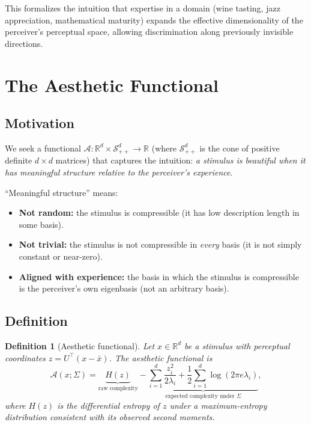 \documentclass[journal]{IEEEtran}
\newtheorem{definition}[theorem]{Definition}
\newcommand{\R}{\mathbb{R}}
\begin{document}
This formalizes the intuition that expertise in a domain (wine tasting,
jazz appreciation, mathematical maturity) expands the effective
dimensionality of the perceiver's perceptual space, allowing
discrimination along previously invisible directions.


\section{The Aesthetic Functional}
\label{sec:functional}

\subsection{Motivation}

We seek a functional $\mathcal{A}: \R^d \times \mathcal{S}_{++}^d
\to \R$ (where $\mathcal{S}_{++}^d$ is the cone of positive definite
$d \times d$ matrices) that captures the intuition: \emph{a stimulus
is beautiful when it has meaningful structure relative to the
perceiver's experience}.

``Meaningful structure'' means:
\begin{itemize}
    \item \textbf{Not random:} the stimulus is compressible (it has
    low description length in some basis).
    \item \textbf{Not trivial:} the stimulus is not compressible in
    \emph{every} basis (it is not simply constant or near-zero).
    \item \textbf{Aligned with experience:} the basis in which the
    stimulus is compressible is the perceiver's own eigenbasis (not
    an arbitrary basis).
\end{itemize}

\subsection{Definition}

\begin{definition}[Aesthetic functional]
\label{def:aesthetic}
Let $x \in \R^d$ be a stimulus with perceptual coordinates
$z = U^\top(x - \bar{x})$.  The \emph{aesthetic functional} is
\begin{equation}
    \mathcal{A}(x; \Sigma) =
    \underbrace{H(z)}_{\text{raw complexity}}
    - \underbrace{\sum_{i=1}^d \frac{z_i^2}{2\lambda_i}
    + \frac{1}{2}\sum_{i=1}^d \log(2\pi e \lambda_i)
    }_{\text{expected complexity under }\Sigma},
    \label{eq:aesthetic}
\end{equation}
where $H(z)$ is the differential entropy of $z$ under a maximum-entropy
distribution consistent with its observed second moments.
\end{definition}
\end{document}
